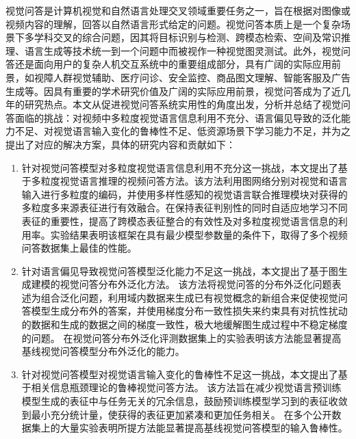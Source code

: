 
\begin{chineseabstract}

视觉问答是计算机视觉和自然语言处理交叉领域重要任务之一，旨在根据对图像或视频内容的理解，回答以自然语言形式给定的问题。视觉问答本质上是一个复杂场景下多学科交叉的综合问题，因其将目标识别与检测、跨模态检索、空间及常识推理、语言生成等技术统一到一个问题中而被视作一种视觉图灵测试。此外，视觉问答还是面向用户的复杂人机交互系统中的重要组成部分，具有广阔的实际应用前景，如视障人群视觉辅助、医疗问诊、安全监控、商品图文理解、智能客服及广告生成等。因具有重要的学术研究价值及广阔的实际应用前景，视觉问答成为了近几年的研究热点。本文从促进视觉问答系统实用性的角度出发，分析并总结了视觉问答面临的挑战：对视频中多粒度视觉语言信息利用不充分、语言偏见导致的泛化能力不足、对视觉语言输入变化的鲁棒性不足、低资源场景下学习能力不足，并为之提出了对应的解决方案，具体的研究内容和贡献如下：

\begin{enumerate}[wide,]
\item 针对视觉问答模型对多粒度视觉语言信息利用不充分这一挑战，本文提出了基于多粒度视觉语言推理的视频问答方法。该方法利用图网络分别对视觉和语言输入进行多粒度的编码，并使用多样性感知的视觉语言联合推理模块对获得的多粒度多来源表征进行有效融合。在保持表征判别性的同时自适应地学习不同表征的重要性，提高了跨模态表征整合的有效性及对多粒度视觉语言信息的利用率。实验结果表明该框架在具有最少模型参数量的条件下，取得了多个视频问答数据集上最佳的性能。


\item 针对语言偏见导致视觉问答模型泛化能力不足这一挑战，本文提出了基于图生成建模的视觉问答分布外泛化方法。
该方法将视觉问答的分布外泛化问题表述为组合泛化问题，利用域内数据来生成已有视觉概念的新组合来促使视觉问答模型生成分布外的答案，并使用梯度分布一致性损失来约束具有对抗性扰动的数据和生成的数据之间的梯度一致性，极大地缓解图生成过程中不稳定梯度的问题。
在视觉问答分布外泛化评测数据集上的实验表明该方法能显著提高基线视觉问答模型分布外泛化的能力。


\item 针对视觉问答模型对视觉语言输入变化的鲁棒性不足这一挑战，本文提出了基于相关信息瓶颈理论的鲁棒视觉问答方法。
该方法旨在减少视觉语言预训练模型生成的表征中与任务无关的冗余信息，鼓励预训练模型学习到的表征收敛到最小充分统计量，使获得的表征更加紧凑和更加任务相关。
在多个公开数据集上的大量实验表明所提方法能显著提高基线视觉问答模型的输入鲁棒性。



\end{enumerate}
\end{chineseabstract}
